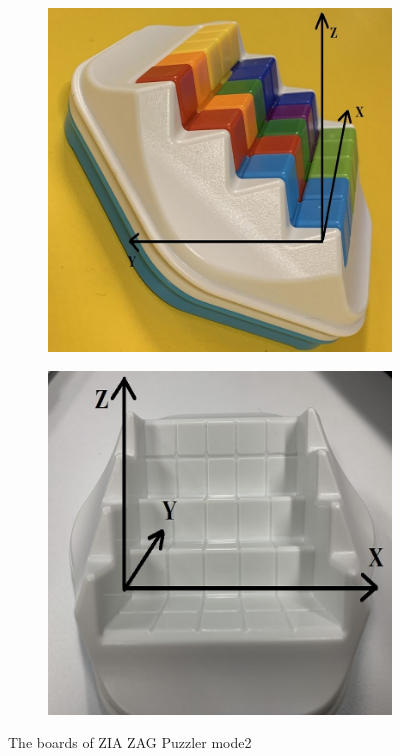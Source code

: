\begin{figure}[htbp]
\centering
\begin{subfigure}[b]{.4\textwidth}
\centering
\includegraphics[width=\textwidth]{figs/ZIGZAGmodel2board.jpg}
\caption{}
\label{fig:board2A}
\end{subfigure}
\begin{subfigure}[b]{.4\textwidth}
\centering
\includegraphics[width=\textwidth]{figs/3Dboard2.jpg}
\caption{}
\label{fig:board2B}
\end{subfigure}
\caption{The boards of ZIA ZAG Puzzler mode2}
  \label{fig:board2}
\end{figure}

